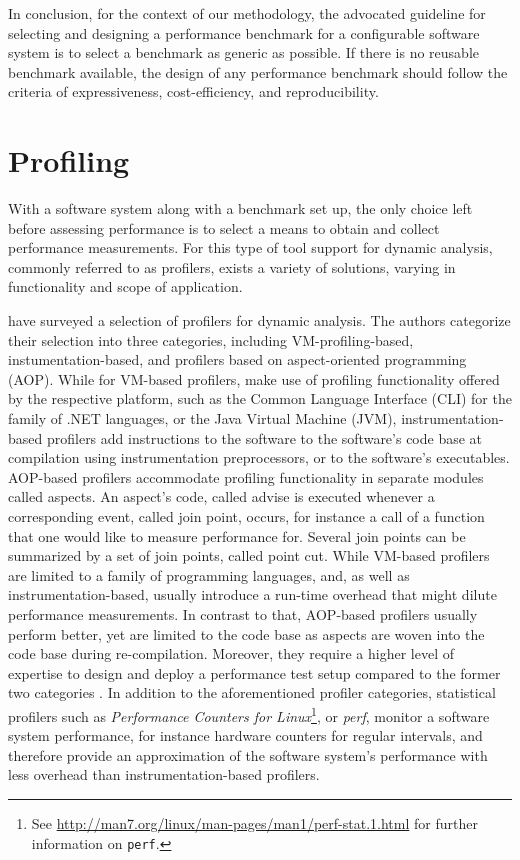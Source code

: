 In conclusion, for the context of our methodology, the advocated guideline for
selecting and designing a performance benchmark for a configurable software
system is to select a benchmark as generic as possible. If there is no reusable
benchmark available, the design of any performance benchmark should follow the
criteria of expressiveness, cost-efficiency, and reproducibility.

\section{Profiling}
With a software system along with a benchmark set up, the only choice left
before assessing performance is to select a means to obtain and collect
performance measurements. For this type of tool support for dynamic analysis,
commonly referred to as profilers, exists a variety of solutions, varying in
functionality and scope of application.

\cite{satapathy_survey_2015} have surveyed a selection of profilers for dynamic
analysis. The authors categorize their selection into three categories,
including VM-profiling-based, instumentation-based, and profilers based on
aspect-oriented programming (AOP). While for VM-based profilers, make use of
profiling functionality offered by the respective platform, such as the Common
Language Interface (CLI) for the family of .NET languages,  or the Java Virtual
Machine (JVM), instrumentation-based profilers add instructions to the software
to the software’s code base at compilation using instrumentation preprocessors,
or to the software’s executables. AOP-based profilers accommodate profiling
functionality in separate modules called aspects. An aspect’s code, called
advise is executed whenever a corresponding event, called join point,  occurs,
for instance a call of a function that one would like to measure performance
for. Several join points can be summarized by a set of join points, called
point cut. While VM-based profilers are limited to a family of programming
languages, and, as well as instrumentation-based, usually introduce a run-time
overhead that might dilute performance measurements. In contrast to that,
AOP-based profilers  usually perform better, yet are limited to the code base as aspects
are woven into the code base during re-compilation. Moreover, they require a
higher level of expertise to design and deploy a performance test setup
compared to the former two categories \citep{satapathy_survey_2015}. In addition
to the aforementioned profiler categories, statistical profilers such as
\emph{Performance Counters for
Linux}\footnote{See
\url{http://man7.org/linux/man-pages/man1/perf-stat.1.html} for further
information on \texttt{perf}.}, or \emph{perf}, monitor a software system
performance, for instance hardware counters for regular intervals, and therefore provide an approximation of the software system’s performance with less overhead than instrumentation-based profilers.

